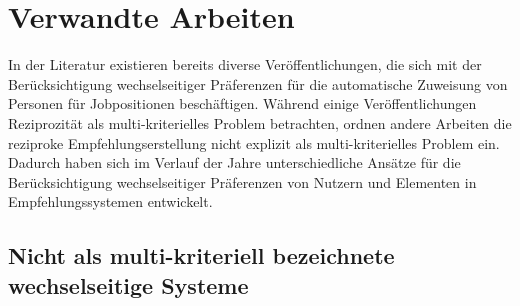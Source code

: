 
\chapter{Verwandte Arbeiten}
\label{ch:verwandte_arbeiten}
In der Literatur existieren bereits diverse Veröffentlichungen, die sich mit der Berücksichtigung wechselseitiger Präferenzen für die automatische Zuweisung von Personen für Jobpositionen beschäftigen.
Während einige Veröffentlichungen Reziprozität als multi-kriterielles Problem betrachten, ordnen andere Arbeiten die reziproke Empfehlungserstellung nicht explizit als multi-kriterielles Problem ein.
Dadurch haben sich im Verlauf der Jahre unterschiedliche Ansätze für die Berücksichtigung wechselseitiger Präferenzen von Nutzern und Elementen in Empfehlungssystemen entwickelt.

\section{Nicht als multi-kriteriell bezeichnete wechselseitige Systeme}
\label{ch:verwandte_arbeiten:1}

